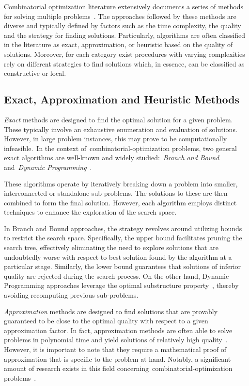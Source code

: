 Combinatorial optimization literature extensively documents a series of methods
for solving multiple
problems~\cite{papadimitriou1998combinatorial,yu2010combinatorial,luke2013essentialsa}.
The approaches followed by these methods are diverse and typically defined by
factors such as the time complexity, the quality and the strategy for finding
solutions. Particularly, algorithms are often classified in the literature as
exact, approximation, or heuristic based on the quality of solutions. Moreover,
for each category exist procedures with varying complexities rely on different
strategies to find solutions which, in essence, can be classified as
constructive or local.

\subsection{Exact, Approximation and Heuristic Methods}
\label{subsec:approaches}

\emph{Exact} methods are designed to find the optimal solution for a given
problem. These typically involve an exhaustive enumeration and evaluation of
solutions. However, in large problem instances, this may prove to be
computationally infeasible.~In the context
of~\acrshort{combinatorial-optimization} problems, two general exact algorithms
are well-known and widely studied:~\textit{Branch and Bound} and~\textit{Dynamic
  Programming}~\cite{clausen1999branch,festa2014brief}.

These algorithms operate by iteratively breaking down a problem into smaller,
interconnected or standalone sub-problems. The solutions to these are then
combined to form the final solution. However, each algorithm employs distinct
techniques to enhance the exploration of the search space.

In Branch and Bound approaches, the strategy revolves around utilizing bounds to
restrict the search space. Specifically, the upper bound facilitates pruning the
search tree, effectively eliminating the need to explore solutions that are
undoubtedly worse with respect to best solution found by the algorithm at a
particular stage. Similarly, the lower bound guarantees that solutions of
inferior quality are rejected during the search process. On the other hand,
Dynamic Programming approaches leverage the optimal substructure
property~\cite{festa2014brief}, thereby avoiding recomputing previous
sub-problems.

\emph{Approximation} methods are designed to find solutions that are provably
guaranteed to be close to the optimal quality with respect to a given
approximation factor. In fact, approximation methods are often able to solve
problems in polynomial time and yield solutions of relatively high
quality~\cite{williamson2011design}.  However, it is important to note that
they require a mathematical proof of approximation that is specific to the
problem at hand. Notably, a significant amount of research exists in this field
concerning~\acrshort{combinatorial-optimization}
problems~\cite{johnson1974approximation}.

